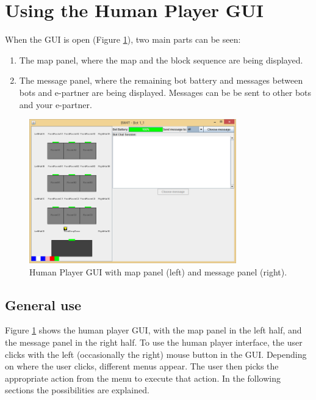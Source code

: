 
\section{Using the Human Player GUI}\label{ch:usingHI} 

When the GUI is open (Figure \ref{fig:humanPlayerGUI}), two main parts can be seen:
\begin{enumerate}
\item The map panel, where the map and the block sequence are being displayed.
\item The message panel, where the remaining bot battery and messages between bots and e-partner are being displayed. Messages can be be sent to other bots and your e-partner.
\end{enumerate}


\begin{figure}[h]
\begin{center}
\includegraphics[width = 0.8\textwidth]{HumanPlayerGUI/hpg.png}
\caption{Human Player GUI with map panel (left) and message panel (right).}
\label{fig:humanPlayerGUI}
\end{center}
\end{figure}

\subsection{General use}
Figure \ref{fig:humanPlayerGUI} shows the human player GUI, with the map panel in the left half, and the message panel in the right half. To use the human player interface, the user clicks with the left (occasionally the right) mouse button in the GUI. Depending on where the user clicks, different menus appear. The user then picks the appropriate action from the menu to execute that action. In the following sections the possibilities are explained.

